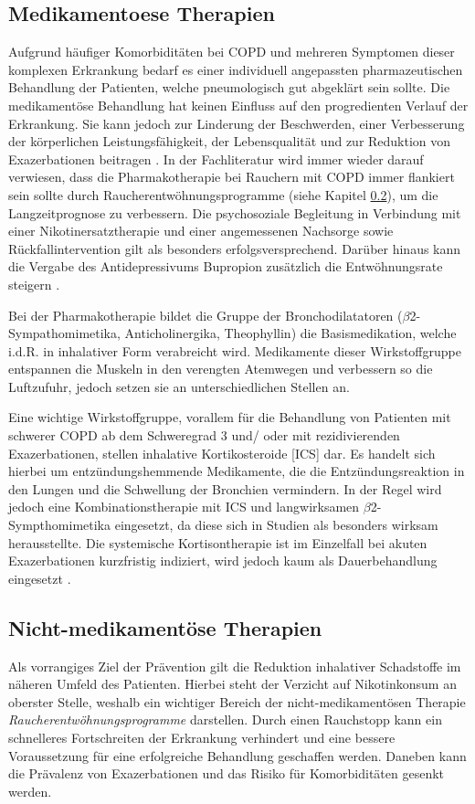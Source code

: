 \subsection{Medikamentoese Therapien}
\label{medikamentoese_therapien}
Aufgrund häufiger Komorbiditäten bei COPD und mehreren Symptomen dieser komplexen Erkrankung bedarf es einer individuell angepassten pharmazeutischen Behandlung der Patienten, welche pneumologisch gut abgeklärt sein sollte. Die medikamentöse Behandlung hat keinen Einfluss auf den progredienten Verlauf der Erkrankung. Sie kann jedoch zur Linderung der Beschwerden, einer Verbesserung der körperlichen Leistungsfähigkeit, der Lebensqualität und zur Reduktion von Exazerbationen beitragen \autocite[vgl.][249]{gillissen2007}. In der Fachliteratur wird immer wieder darauf verwiesen, dass die Pharmakotherapie bei Rauchern mit COPD immer flankiert sein sollte durch Raucherentwöhnungsprogramme (siehe Kapitel \ref{nicht-medikamentoese_therapien}), um die Langzeitprognose zu verbessern. Die psychosoziale Begleitung in Verbindung mit einer Nikotinersatztherapie und einer angemessenen Nachsorge sowie Rückfallintervention gilt als besonders erfolgsversprechend. Darüber hinaus kann die Vergabe des Antidepressivums Bupropion zusätzlich die Entwöhnungsrate steigern \autocite[vgl.][e12]{vogelmeier2007}.

Bei der Pharmakotherapie bildet die Gruppe der Bronchodilatatoren ($\beta$2- Sympathomimetika, Anticholinergika, Theophyllin) die Basismedikation, welche i.d.R. in inhalativer Form verabreicht wird.
Medikamente dieser Wirkstoffgruppe entspannen die Muskeln in den verengten Atemwegen und verbessern so die Luftzufuhr, jedoch setzen sie an unterschiedlichen Stellen an.

Eine wichtige Wirkstoffgruppe, vorallem für die Behandlung von Patienten mit schwerer COPD ab dem Schweregrad 3 und/ oder mit rezidivierenden Exazerbationen, stellen inhalative Kortikosteroide [ICS] dar. Es handelt sich hierbei um entzündungshemmende Medikamente, die die Entzündungsreaktion in den Lungen und die Schwellung der Bronchien vermindern. In der Regel wird jedoch eine Kombinationstherapie mit ICS und langwirksamen $\beta$2-Sympthomimetika eingesetzt, da diese sich in Studien als besonders wirksam herausstellte. Die systemische Kortisontherapie ist im Einzelfall bei akuten Exazerbationen kurzfristig indiziert, wird jedoch kaum als Dauerbehandlung eingesetzt \autocite[vgl.][249f., 253]{gillissen2007}.

\subsection{Nicht-medikamentöse Therapien}
\label{nicht-medikamentoese_therapien}
Als vorrangiges Ziel der Prävention gilt die Reduktion inhalativer Schadstoffe im näheren Umfeld des Patienten. Hierbei steht der Verzicht auf Nikotinkonsum an oberster Stelle, weshalb ein wichtiger Bereich der nicht-medikamentösen Therapie \emph{Raucherentwöhnungsprogramme} darstellen. Durch einen Rauchstopp kann ein schnelleres Fortschreiten der Erkrankung verhindert und eine bessere Voraussetzung für eine erfolgreiche Behandlung geschaffen werden. Daneben kann die Prävalenz von Exazerbationen und das Risiko für Komorbiditäten gesenkt werden.

